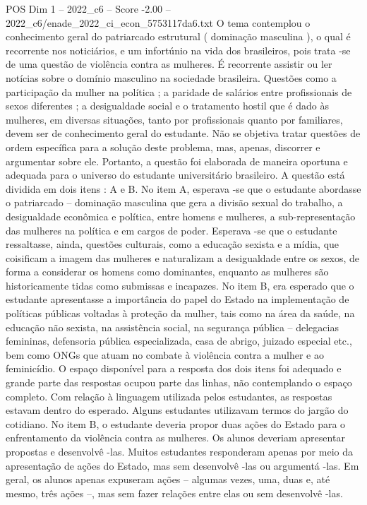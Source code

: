 \begin{textsample}{POS Dim 1 – 2022\_c6 – Score -2.00 – 2022\_c6/enade\_2022\_ci\_econ\_5753117da6.txt}
O tema contemplou o conhecimento geral do patriarcado estrutural ( dominação masculina ), o qual é recorrente nos noticiários, e um infortúnio na vida dos brasileiros, pois trata -se de uma questão de violência contra as mulheres.
É recorrente assistir ou ler notícias sobre o domínio masculino na sociedade brasileira.
Questões como a participação da mulher na política ; a paridade de salários entre profissionais de sexos diferentes ; a desigualdade social e o tratamento hostil que é dado às mulheres, em diversas situações, tanto por profissionais quanto por familiares, devem ser de conhecimento geral do estudante.
Não se objetiva tratar questões de ordem específica para a solução deste problema, mas, apenas, discorrer e argumentar sobre ele.
Portanto, a questão foi elaborada de maneira oportuna e adequada para o universo do estudante universitário brasileiro.
A questão está dividida em dois itens : A e B.
No item A, esperava -se que o estudante abordasse o patriarcado – dominação masculina que gera a divisão sexual do trabalho, a desigualdade econômica e política, entre homens e mulheres, a sub-representação das mulheres na política e em cargos de poder.
Esperava -se que o estudante ressaltasse, ainda, questões culturais, como a educação sexista e a mídia, que coisificam a imagem das mulheres e naturalizam a desigualdade entre os sexos, de forma a considerar os homens como dominantes, enquanto as mulheres são historicamente tidas como submissas e incapazes.
No item B, era esperado que o estudante apresentasse a importância do papel do Estado na implementação de políticas públicas voltadas à proteção da mulher, tais como na área da saúde, na educação não sexista, na assistência social, na segurança pública – delegacias femininas, defensoria pública especializada, casa de abrigo, juizado especial etc., bem como ONGs que atuam no combate à violência contra a mulher e ao feminicídio.
O espaço disponível para a resposta dos dois itens foi adequado e grande parte das respostas ocupou parte das linhas, não contemplando o espaço completo.
Com relação à linguagem utilizada pelos estudantes, as respostas estavam dentro do esperado.
Alguns estudantes utilizavam termos do jargão do cotidiano.
No item B, o estudante deveria propor duas ações do Estado para o enfrentamento da violência contra as mulheres.
Os alunos deveriam apresentar propostas e desenvolvê -las.
Muitos estudantes responderam apenas por meio da apresentação de ações do Estado, mas sem desenvolvê -las ou argumentá -las.
Em geral, os alunos apenas expuseram ações – algumas vezes, uma, duas e, até mesmo, três ações –, mas sem fazer relações entre elas ou sem desenvolvê -las.

\end{textsample}
